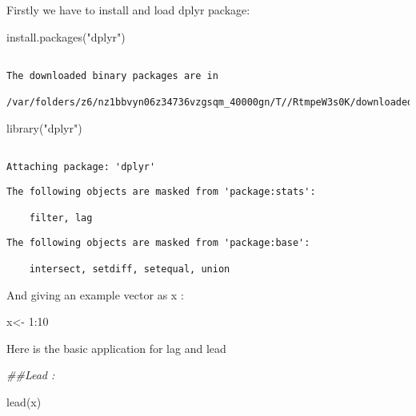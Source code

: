 \documentclass[
  letterpaper,
  DIV=11,
  numbers=noendperiod]{scrreprt}
\newenvironment{Shaded}{\begin{snugshade}}{\end{snugshade}}
\newcommand{\DecValTok}[1]{\textcolor[rgb]{0.68,0.00,0.00}{#1}}
\newcommand{\DocumentationTok}[1]{\textcolor[rgb]{0.37,0.37,0.37}{\textit{#1}}}
\newcommand{\FunctionTok}[1]{\textcolor[rgb]{0.28,0.35,0.67}{#1}}
\newcommand{\NormalTok}[1]{\textcolor[rgb]{0.00,0.23,0.31}{#1}}
\newcommand{\OtherTok}[1]{\textcolor[rgb]{0.00,0.23,0.31}{#1}}
\newcommand{\SpecialCharTok}[1]{\textcolor[rgb]{0.37,0.37,0.37}{#1}}
\newcommand{\StringTok}[1]{\textcolor[rgb]{0.13,0.47,0.30}{#1}}
\begin{document}
Firstly we have to install and load dplyr package:

\begin{Shaded}
\begin{Highlighting}[]
\FunctionTok{install.packages}\NormalTok{(}\StringTok{"dplyr"}\NormalTok{)       }
\end{Highlighting}
\end{Shaded}

\begin{verbatim}

The downloaded binary packages are in
    /var/folders/z6/nz1bbvyn06z34736vzgsqm_40000gn/T//RtmpeW3s0K/downloaded_packages
\end{verbatim}

\begin{Shaded}
\begin{Highlighting}[]
\FunctionTok{library}\NormalTok{(}\StringTok{"dplyr"}\NormalTok{)     }
\end{Highlighting}
\end{Shaded}

\begin{verbatim}

Attaching package: 'dplyr'
\end{verbatim}

\begin{verbatim}
The following objects are masked from 'package:stats':

    filter, lag
\end{verbatim}

\begin{verbatim}
The following objects are masked from 'package:base':

    intersect, setdiff, setequal, union
\end{verbatim}

And giving an example vector as x :

\begin{Shaded}
\begin{Highlighting}[]
\NormalTok{x}\OtherTok{\textless{}{-}} \DecValTok{1}\SpecialCharTok{:}\DecValTok{10}
\end{Highlighting}
\end{Shaded}

Here is the basic application for lag and lead

\begin{Shaded}
\begin{Highlighting}[]
\DocumentationTok{\#\#Lead :}

\FunctionTok{lead}\NormalTok{(x)}
\end{Highlighting}
\end{Shaded}
\end{document}
